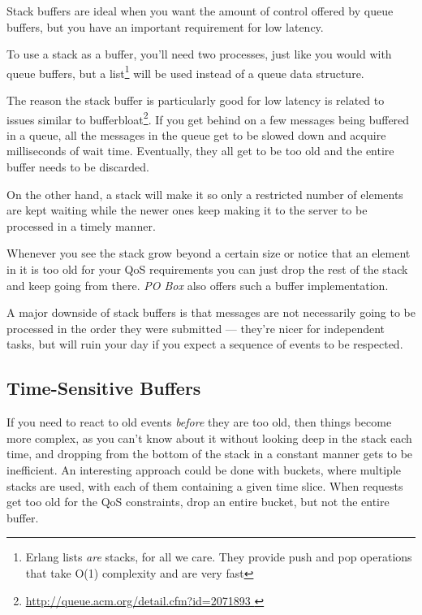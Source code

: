 Stack buffers are ideal when you want the amount of control offered by queue buffers, but you have an important requirement for low latency.

To use a stack as a buffer, you'll need two processes, just like you would with queue buffers, but a list\footnote{Erlang lists \emph{are} stacks, for all we care. They provide push and pop operations that take O(1) complexity and are very fast} will be used instead of a queue data structure.

The reason the stack buffer is particularly good for low latency is related to issues similar to bufferbloat\footnote{\href{http://queue.acm.org/detail.cfm?id=2071893}{http://queue.acm.org/detail.cfm?id=2071893 }}. If you get behind on a few messages being buffered in a queue, all the messages in the queue get to be slowed down and acquire milliseconds of wait time. Eventually, they all get to be too old and the entire buffer needs to be discarded.


On the other hand, a stack will make it so only a restricted number of elements are kept waiting while the newer ones keep making it to the server to be processed in a timely manner.


Whenever you see the stack grow beyond a certain size or notice that an element in it is too old for your QoS requirements you can just drop the rest of the stack and keep going from there. \emph{PO Box} also offers such a buffer implementation.

A major downside of stack buffers is that messages are not necessarily going to be processed in the order they were submitted — they're nicer for independent tasks, but will ruin your day if you expect a sequence of events to be respected.

\subsection{Time-Sensitive Buffers}

If you need to react to old events \emph{before} they are too old, then things become more complex, as you can't know about it without looking deep in the stack each time, and dropping from the bottom of the stack in a constant manner gets to be inefficient. An interesting approach could be done with buckets, where multiple stacks are used, with each of them containing a given time slice. When requests get too old for the QoS constraints, drop an entire bucket, but not the entire buffer.

